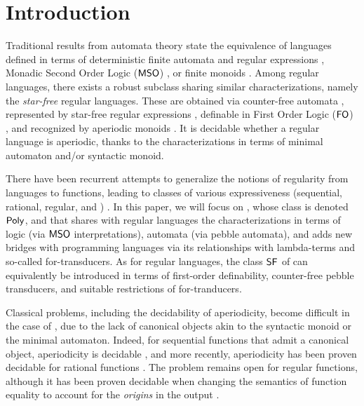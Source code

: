 \section{Introduction}
\label{introduction:sec}

Traditional results from automata theory state the equivalence of languages
defined in terms of deterministic finite automata and regular expressions
\cite{kleene1956representation}, Monadic Second Order Logic ($\mathsf{MSO}$)
\cite{buchi1960weak}, or finite monoids \cite{schutzenberger1961definition}.
Among regular languages, there exists a robust subclass sharing similar
characterizations, namely the \emph{star-free} regular languages. These are
obtained via counter-free automata \cite{mcnaughton1971counter}, represented by
star-free regular expressions \cite{schutzenberger1965finite}, definable in
First Order Logic ($\mathsf{FO}$) \cite{perrin1986first}, and recognized by aperiodic
monoids \cite{schutzenberger1965finite}. It is decidable whether a regular
language is aperiodic, thanks to the characterizations in terms of minimal
automaton and/or syntactic monoid.

There have been recurrent attempts to generalize the notions of regularity from
languages to functions, leading to classes of various expressiveness
(sequential, rational, regular, and ) \cite[see,
e.g.][]{bojanczyk2019string}. In this paper, we will focus on , whose class is denoted $\Poly$, and that shares with regular
languages the characterizations in terms of logic (via $\mathsf{MSO}$ interpretations),
automata (via pebble automata), and adds new bridges with programming languages
via its relationships with lambda-terms and so-called for-transducers. As for
regular languages, the class $\SF$ of 
can equivalently be introduced in terms of first-order definability,
counter-free pebble transducers, and suitable restrictions of for-tranducers.


Classical problems, including the decidability of aperiodicity, become
difficult in the case of , due to the lack of
canonical objects akin to the syntactic monoid or the minimal automaton.
Indeed, for sequential functions that admit a canonical object, aperiodicity is
decidable \cite{choffrut03}, and more recently, aperiodicity has been proven
decidable for rational functions
\cite{filiot2016aperiodicity,filiot2018canonical}. The problem remains open for
regular functions, although it has been proven decidable when changing the
semantics of function equality to account for the \emph{origins} in the output
\cite{bojanczyk14}.

